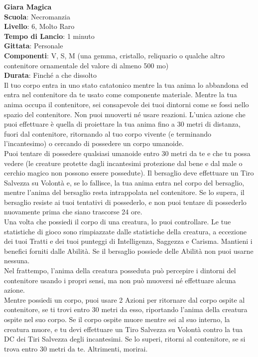 \begin{multicols}{2}
\medskip\textbf{Giara Magica}\\
\textbf{Scuola}: Necromanzia\\
\textbf{Livello}: 6, Molto Raro\\
\textbf{Tempo di Lancio}: 1 minuto\\
\textbf{Gittata}: Personale\\
\textbf{Componenti}: V, S, M (una gemma, cristallo, reliquario o qualche altro contenitore ornamentale del valore di almeno 500 mo)\\
\textbf{Durata}: Finché a che dissolto\\
Il tuo corpo entra in uno stato catatonico mentre la tua anima lo abbandona ed entra nel contenitore da te usato come componente materiale. Mentre la tua anima occupa il contenitore, sei consapevole dei tuoi dintorni come se fossi nello spazio del contenitore. Non puoi muoverti né usare reazioni. L'unica azione che puoi effettuare è quella di proiettare la tua anima fino a 30 metri di distanza, fuori dal contenitore, ritornando al tuo corpo vivente (e terminando l'incantesimo) o cercando di possedere un corpo umanoide.\\
Puoi tentare di possedere qualsiasi umanoide entro 30 metri da te e che tu possa vedere (le creature protette dagli incantesimi protezione dal bene e dal male o cerchio magico non possono essere possedute). Il bersaglio deve effettuare un Tiro Salvezza su Volontà e, se lo fallisce, la tua anima entra nel corpo del bersaglio, mentre l'anima del bersaglio resta intrappolata nel contenitore. Se lo supera, il bersaglio resiste ai tuoi tentativi di possederlo, e non puoi tentare di possederlo nuovamente prima che siano trascorse 24 ore.\\
Una volta che possiedi il corpo di una creatura, lo puoi controllare. Le tue statistiche di gioco sono rimpiazzate dalle statistiche della creatura, a eccezione dei tuoi Tratti e dei tuoi punteggi di Intelligenza, Saggezza e Carisma. Mantieni i benefici forniti dalle Abilità. Se il bersaglio possiede delle Abilità non puoi usarne nessuna.\\
Nel frattempo, l'anima della creatura posseduta può percepire i dintorni del contenitore usando i propri sensi, ma non può muoversi né effettuare alcuna azione.\\
Mentre possiedi un corpo, puoi usare 2 Azioni per ritornare dal corpo ospite al contenitore, se ti trovi entro 30 metri da esso, riportando l'anima della creatura ospite nel suo corpo. Se il corpo ospite muore mentre sei al suo interno, la creatura muore, e tu devi effettuare un Tiro Salvezza su Volontà contro la tua DC dei Tiri Salvezza degli incantesimi. Se lo superi, ritorni al contenitore, se si trova entro 30 metri da te. Altrimenti, morirai.\\

\end{multicols}
